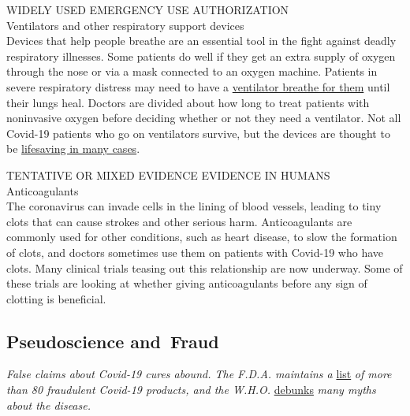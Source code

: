 WIDELY USED EMERGENCY USE AUTHORIZATION\\
Ventilators and other respiratory support devices\\
Devices that help people breathe are an essential tool in the fight
against deadly respiratory illnesses. Some patients do well if they get
an extra supply of oxygen through the nose or via a mask connected to an
oxygen machine. Patients in severe respiratory distress may need to have
a
\href{https://www.nytimes3xbfgragh.onion/interactive/2020/05/08/health/coronavirus-covid-lungs-ventilators.html}{ventilator
breathe for them} until their lungs heal. Doctors are divided about how
long to treat patients with noninvasive oxygen before deciding whether
or not they need a ventilator. Not all Covid-19 patients who go on
ventilators survive, but the devices are thought to be
\href{https://www.nytimes3xbfgragh.onion/2020/04/26/health/coronavirus-patient-ventilator.html}{lifesaving
in many cases}.

TENTATIVE OR MIXED EVIDENCE EVIDENCE IN HUMANS\\
Anticoagulants\\
The coronavirus can invade cells in the lining of blood vessels, leading
to tiny clots that can cause strokes and other serious harm.
Anticoagulants are commonly used for other conditions, such as heart
disease, to slow the formation of clots, and doctors sometimes use them
on patients with Covid-19 who have clots. Many clinical trials teasing
out this relationship are now underway. Some of these trials are looking
at whether giving anticoagulants before any sign of clotting is
beneficial.

\hypertarget{pseudoscience-and-fraud}{%
\subsection{Pseudoscience and~Fraud}\label{pseudoscience-and-fraud}}

\emph{False claims about Covid-19 cures abound. The F.D.A. maintains a}
\href{https://www.fda.gov/consumers/health-fraud-scams/fraudulent-coronavirus-disease-2019-covid-19-products}{list}
\emph{of more than 80 fraudulent Covid-19 products, and the W.H.O.}
\href{https://www.who.int/emergencies/diseases/novel-coronavirus-2019/advice-for-public/myth-busters}{debunks}
\emph{many myths about the disease.}

